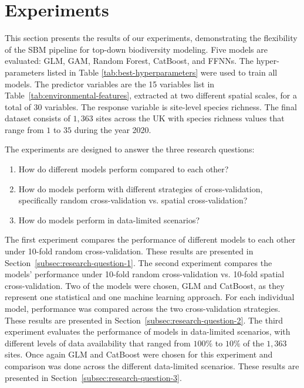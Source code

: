 \section{Experiments}\label{sec:Experiments}

This section presents the results of our experiments, demonstrating the flexibility of the SBM pipeline for top-down biodiversity modeling. Five models are evaluated: GLM, GAM, Random Forest, CatBoost, and FFNNs. The hyper-parameters listed in Table \ref{tab:best-hyperparameters} were used to train all models. The predictor variables are the 15 variables list in Table~\ref{tab:environmental-features}, extracted at two different spatial scales, for a total of 30  variables. The response variable is site-level species richness. The final dataset consists of \(1,363\) sites across the UK with species richness values that range from \(1\) to \(35\) during the year 2020. 

The experiments are designed to answer the three research questions:
\begin{enumerate}
    \item How do different models perform compared to each other?
    \item How do models perform with different strategies of cross-validation, specifically random cross-validation vs. spatial cross-validation?
    \item How do models perform in data-limited scenarios?
\end{enumerate} 

The first experiment compares the performance of different models to each other under 10-fold random cross-validation. These results are presented in Section~\ref{subsec:research-question-1}. The second experiment compares the models' performance under 10-fold random cross-validation vs. 10-fold spatial cross-validation. Two of the models were chosen, GLM and CatBoost, as they represent one statistical and one machine learning approach. For each individual model, performance was compared across the two cross-validation strategies. These results are presented in Section~\ref{subsec:research-question-2}. The third experiment evaluates the performance of models in data-limited scenarios, with different levels of data availability that ranged from \(100\%\) to \(10\%\) of the \(1,363\) sites. Once again GLM and CatBoost were chosen for this experiment and comparison was done across the different data-limited scenarios. These results are presented in Section~\ref{subsec:research-question-3}.

